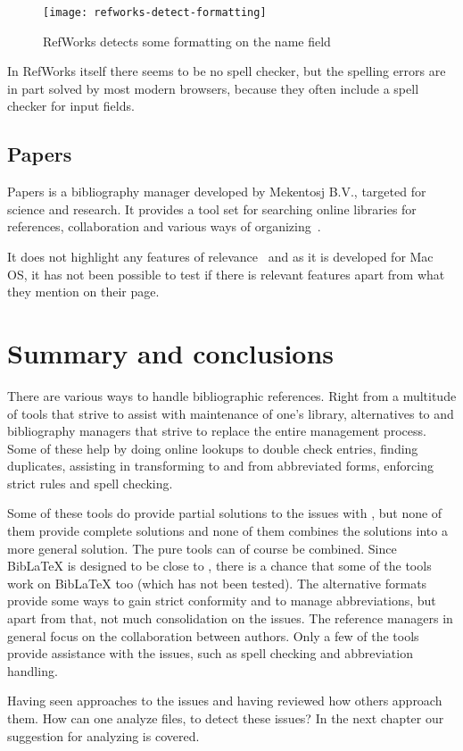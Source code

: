 \begin{figure}
    \centering
    \texttt{[image: refworks-detect-formatting]}
    \caption{RefWorks detects some formatting on the name field}
    \label{fig:refworks-detect-formatting}
\end{figure}

In RefWorks itself there seems to be no spell checker, but the
spelling errors are in part solved by most modern browsers, because
they often include a spell checker for input fields.

\subsection{Papers}
Papers is a bibliography manager developed by Mekentosj B.V., targeted
for science and research.  It provides a tool set for searching online
libraries for references, collaboration and various ways of
organizing~\cite{papers_features}.

It does not highlight any features of relevance~\cite{papers_features}
and as it is developed for Mac OS, it has not been possible to test if
there is relevant features apart from what they mention on their page.




\section{Summary and conclusions}
There are various ways to handle bibliographic references.  Right from
a multitude of tools that strive to assist with maintenance of one's
{\bibtex} library, alternatives to {\bibtex} and bibliography managers
that strive to replace the entire management process.  Some of these
help by doing online lookups to double check entries, finding
duplicates, assisting in transforming to and from abbreviated forms,
enforcing strict rules and spell checking.

Some of these tools do provide partial solutions to the issues with
{\bibtex}, but none of them provide complete solutions and none of
them combines the solutions into a more general solution.  The pure
{\bibtex} tools can of course be combined.  Since Bib{\LaTeX} is
designed to be close to {\bibtex}, there is a chance that some of the
{\bibtex} tools work on Bib{\LaTeX} too (which has not been tested).
The alternative formats provide some ways to gain strict conformity
and to manage abbreviations, but apart from that, not much
consolidation on the issues.  The reference managers in general focus
on the collaboration between authors.  Only a few of the tools provide
assistance with the issues, such as spell checking and abbreviation
handling.

Having seen approaches to the {\bibtex} issues and having reviewed how
others approach them.  How can one analyze {\bibtex} files, to detect
these issues?  In the next chapter our suggestion for analyzing is
covered.


